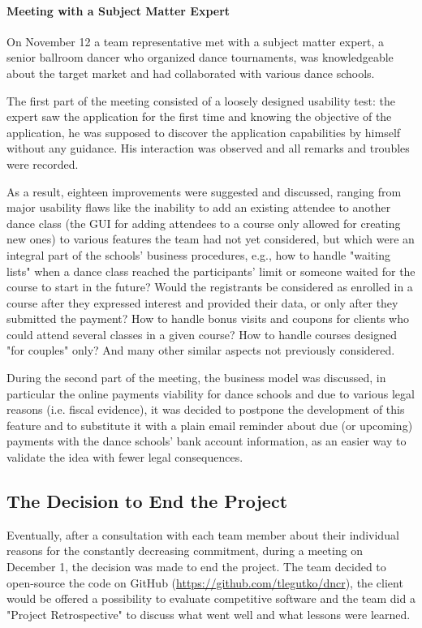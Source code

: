 \documentclass{article}
\begin{document}
\paragraph{Meeting with a Subject Matter Expert}
On November 12 a team representative met with a subject matter expert, a senior ballroom dancer who organized dance tournaments, was knowledgeable about the target market and had collaborated with various dance schools. 

The first part of the meeting consisted of a loosely designed usability test: the expert saw the application for the first time and knowing the objective of the application, he was supposed to discover the application capabilities by himself without any guidance. His interaction was observed and all remarks and troubles were recorded.

As a result, eighteen improvements were suggested and discussed, ranging from major usability flaws like the inability to add an existing attendee to another dance class (the GUI for adding attendees to a course only allowed for creating new ones) to various features the team had not yet considered, but which were an integral part of the schools' business procedures, e.g., how to handle "waiting lists" when a dance class reached the participants' limit or someone waited for the course to start in the future? Would the registrants be considered as enrolled in a course after they expressed interest and provided their data, or only after they submitted the payment? How to handle bonus visits and coupons for clients who could attend several classes in a given course? How to handle courses designed "for couples" only? And many other similar aspects not previously considered.

During the second part of the meeting, the business model was discussed, in particular the online payments viability for dance schools and due to various legal reasons (i.e. fiscal evidence), it was decided to postpone the development of this feature and to substitute it with a plain email reminder about due (or upcoming) payments with the dance schools' bank account information, as an easier way to validate the idea with fewer legal consequences.

\subsection{The Decision to End the Project}
Eventually, after a consultation with each team member about their individual reasons for the constantly decreasing commitment, during a meeting on December 1, the decision was made to end the project. The team decided to open-source the code on GitHub (\url{https://github.com/tlegutko/dncr}), the client would be offered a possibility to evaluate competitive software and the team did a "Project Retrospective" to discuss what went well and what lessons were learned.
\end{document}
